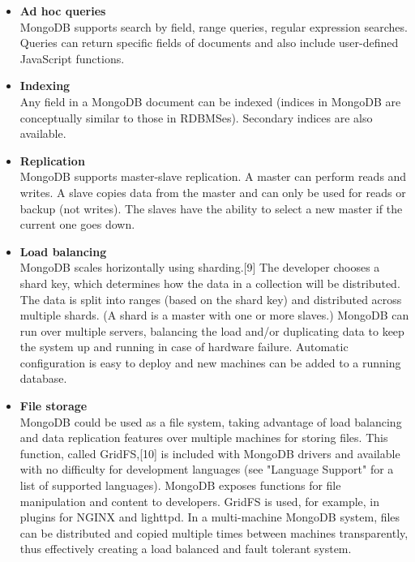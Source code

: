 \begin{itemize}

\item \textbf{Ad hoc queries} \\
MongoDB supports search by field, range queries, regular expression searches. Queries can return specific fields of documents and also include user-defined JavaScript functions.

\item \textbf{Indexing} \\
Any field in a MongoDB document can be indexed (indices in MongoDB are conceptually similar to those in RDBMSes). Secondary indices are also available.

\item \textbf{Replication} \\
MongoDB supports master-slave replication. A master can perform reads and writes. A slave copies data from the master and can only be used for reads or backup (not writes). The slaves have the ability to select a new master if the current one goes down.

\item \textbf{Load balancing} \\
MongoDB scales horizontally using sharding.[9] The developer chooses a shard key, which determines how the data in a collection will be distributed. The data is split into ranges (based on the shard key) and distributed across multiple shards. (A shard is a master with one or more slaves.)
MongoDB can run over multiple servers, balancing the load and/or duplicating data to keep the system up and running in case of hardware failure. Automatic configuration is easy to deploy and new machines can be added to a running database.

\item \textbf{File storage} \\
MongoDB could be used as a file system, taking advantage of load balancing and data replication features over multiple machines for storing files.
This function, called GridFS,[10] is included with MongoDB drivers and available with no difficulty for development languages (see "Language Support" for a list of supported languages). MongoDB exposes functions for file manipulation and content to developers. GridFS is used, for example, in plugins for NGINX and lighttpd. In a multi-machine MongoDB system, files can be distributed and copied multiple times between machines transparently, thus effectively creating a load balanced and fault tolerant system.


\end{itemize}
